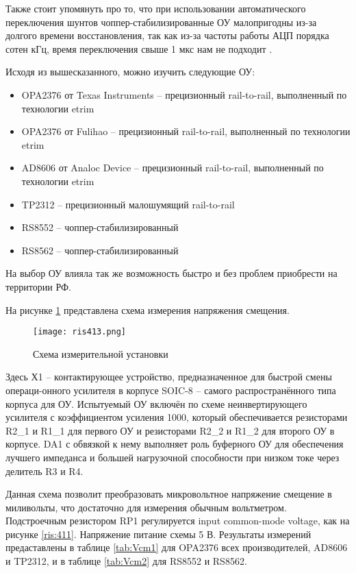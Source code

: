 Также стоит упомянуть про то, что при использовании автоматического переключения шунтов 
чоппер-стабилизированные ОУ малопригодны из-за долгого времени восстановления, так как из-за частоты работы
АЦП порядка сотен кГц, время переключения свыше 1 мкс нам не подходит \cite{Chopper:OU}.

Исходя из вышесказанного, можно изучить следующие ОУ:

\begin{itemize}
    \item OPA2376 от Texas Instruments -- прецизионный rail-to-rail, выполненный по технологии etrim
    \item OPA2376 от Fulihao -- прецизионный rail-to-rail, выполненный по технологии etrim
    \item AD8606 от Analoc Device -- прецизионный rail-to-rail, выполненный по технологии etrim
    \item TP2312 -- прецизионный малошумящий rail-to-rail
    \item RS8552 -- чоппер-стабилизированный
    \item RS8562 -- чоппер-стабилизированный
\end{itemize}

На выбор ОУ влияла так же возможность быстро и без проблем приобрести на территории РФ. 

На рисунке \ref{ris:413} представлена схема измерения напряжения смещения.

\begin{figure}[H]
    \centering
    \texttt{[image: ris413.png]}
    \caption{Схема измерительной установки}
    \label{ris:413}
    \end{figure}

Здесь Х1 -- контактирующее устройство, предназначенное для быстрой смены операци-онного усилителя в 
корпусе SOIC-8 -- самого распространённого типа корпуса для ОУ. Испытуемый ОУ включён по схеме неинвертирующего 
усилителя с коэффициентом усиления 1000, который обеспечивается резисторами R2\_1 и R1\_1 для первого ОУ и
резисторами R2\_2 и R1\_2 для второго ОУ в корпусе. DA1 с обвязкой к нему выполняет роль буферного ОУ для 
обеспечения лучшего импеданса и большей нагрузочной способности при низком токе через делитель R3 и R4.

Данная схема позволит преобразовать микровольтное напряжение смещение в миливольты, что достаточно для 
измерения обычным вольтметром. Подстроечным резистором RP1 регулируется input common-mode voltage, как 
на рисунке \ref{ris:411}. Напряжение питание схемы 5 В. Результаты измерений предаставлены в таблице
\ref{tab:Vcm1} для OPA2376 всех производителей, AD8606 и TP2312, и в таблице \ref{tab:Vcm2} для RS8552 и 
RS8562.

